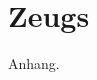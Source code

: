 \renewcommand{\thesection}{\Alph{section}}
\setcounter{figure}{0}
\renewcommand{\thefigure}{\Alph{section}.\arabic{figure}}
\appendix

\captionsetup{list=false}

\section{Zeugs}
Anhang.
